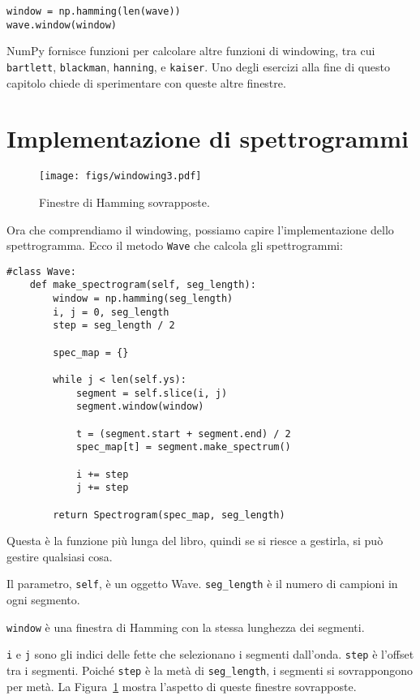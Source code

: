 \documentclass[12pt,a4paper]{book}
\begin{document}
\begin{verbatim} 
window = np.hamming(len(wave))
wave.window(window)
 \end{verbatim} 

NumPy fornisce funzioni per calcolare altre funzioni di windowing, tra cui {\tt bartlett}, {\tt blackman}, {\tt hanning}, e {\tt kaiser}. Uno degli esercizi alla fine di questo capitolo chiede di sperimentare con queste altre finestre.

\section{Implementazione di spettrogrammi} 

\begin{figure} 

\centerline{\texttt{[image: figs/windowing3.pdf]}} \caption{Finestre di Hamming sovrapposte.} \label{fig.windowing3} \end{figure} 

Ora che comprendiamo il windowing, possiamo capire l'implementazione dello spettrogramma. Ecco il metodo {\tt Wave} che calcola gli spettrogrammi:

\begin{verbatim} 
#class Wave:
    def make_spectrogram(self, seg_length):
        window = np.hamming(seg_length)
        i, j = 0, seg_length
        step = seg_length / 2

        spec_map = {}

        while j < len(self.ys):
            segment = self.slice(i, j)
            segment.window(window)

            t = (segment.start + segment.end) / 2
            spec_map[t] = segment.make_spectrum()

            i += step
            j += step

        return Spectrogram(spec_map, seg_length)
 \end{verbatim} 

Questa è la funzione più lunga del libro, quindi se si riesce a gestirla, si può gestire qualsiasi cosa.

Il parametro, {\tt self}, è un oggetto Wave. \verb"seg_length" è il numero di campioni in ogni segmento.

{\tt window} è una finestra di Hamming con la stessa lunghezza dei segmenti.

{\tt i} e {\tt j} sono gli indici delle fette che selezionano i segmenti dall'onda. {\tt step} è l'offset tra i segmenti. Poiché {\tt step} è la metà di \verb"seg_length", i segmenti si sovrappongono per metà. La Figura~\ref{fig.windowing3} mostra l'aspetto di queste finestre sovrapposte.
\end{document}
